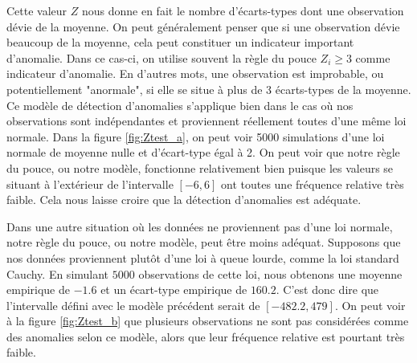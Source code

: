 Cette valeur $Z$ nous donne en fait le nombre d'écarts-types dont une observation dévie de la moyenne. On peut généralement penser que si une observation dévie beaucoup de la moyenne, cela peut constituer un indicateur important d'anomalie. Dans ce cas-ci, on utilise souvent la règle du pouce $Z_i \ge 3$ comme indicateur d'anomalie. En d'autres mots, une observation est improbable, ou potentiellement "anormale", si elle se situe à plus de 3 écarts-types de la moyenne. Ce modèle de détection d'anomalies s'applique bien dans le cas où nos observations sont indépendantes et proviennent réellement toutes d'une même loi normale. Dans la figure \ref{fig:Ztest_a}, on peut voir 5000 simulations d'une loi normale de moyenne nulle et d'écart-type égal à 2. On peut voir que notre règle du pouce, ou notre modèle, fonctionne relativement bien puisque les valeurs se situant à l'extérieur de l'intervalle $[-6, 6]$ ont toutes une fréquence relative très faible. Cela nous laisse croire que la détection d'anomalies est adéquate. 

Dans une autre situation où les données ne proviennent pas d'une loi normale, notre règle du pouce, ou notre modèle, peut être moins adéquat. Supposons que nos données proviennent plutôt d'une loi à queue lourde, comme la loi standard Cauchy. En simulant $5000$ observations de cette loi, nous obtenons une moyenne empirique de $-1.6$ et un écart-type empirique de $160.2$. C'est donc dire que l'intervalle défini avec le modèle précédent serait de $[-482.2, 479]$. On peut voir à la figure \ref{fig:Ztest_b} que plusieurs observations ne sont pas considérées comme des anomalies selon ce modèle, alors que leur fréquence relative est pourtant très faible.

